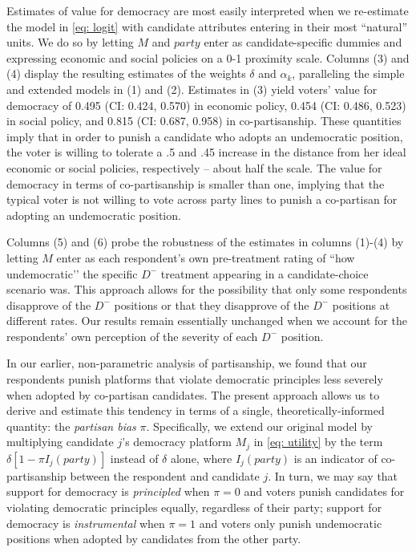 \documentclass[letterpaper, 12pt]{article}
\begin{document}
\begin{raggedright}
Estimates of value for democracy are most easily interpreted when we re-estimate the model in \eqref{eq: logit} with candidate attributes entering in their most ``natural'' units. We do so by letting $M$ and $party$ enter as candidate-specific dummies and expressing economic and social policies on a 0-1 proximity scale. Columns (3) and (4) display the resulting estimates of the weights $\delta$ and $\alpha_k$, paralleling the simple and extended models in (1) and (2). Estimates in (3) yield voters' value for democracy of 0.495 (CI: 0.424, 0.570) in economic policy, 0.454 (CI: 0.486, 0.523) in social policy, and 0.815 (CI: 0.687, 0.958) in co-partisanship. These quantities imply that in order to punish a candidate who adopts an undemocratic position, the voter is willing to tolerate a .5 and .45 increase in the distance from her ideal economic or social policies, respectively -- about half the scale. The value for democracy in terms of co-partisanship is smaller than one, implying that the typical voter is not willing to vote across party lines to punish a co-partisan for adopting an undemocratic position.

Columns (5) and (6) probe the robustness of the estimates in columns (1)-(4) by letting $M$ enter as each respondent's own pre-treatment rating of ``how undemocratic’’ the specific $D^-$ treatment appearing in a candidate-choice scenario was. This approach allows for the possibility that only some respondents disapprove of the $D^-$ positions or that they disapprove of the $D^-$ positions at different rates. Our results remain essentially unchanged when we account for the respondents' own perception of the severity of each $D^-$ position.

In our earlier, non-parametric analysis of partisanship, we found that our respondents punish platforms that violate democratic principles less severely when adopted by co-partisan candidates. The present approach allows us to derive and estimate this tendency in terms of a single, theoretically-informed quantity: the \emph{partisan bias} $\pi$. Specifically, we extend our original model by multiplying candidate $j$'s democracy platform $M_j$ in \eqref{eq: utility} by the term $\delta[1-\pi I_{j}(party)]$ instead of $\delta$ alone, where $I_{j}(party)$ is an indicator of co-partisanship between the respondent and candidate $j$. In turn, we may say that support for democracy is \emph{principled} when $\pi=0$ and voters punish candidates for violating democratic principles equally, regardless of their party; support for democracy is \emph{instrumental} when $\pi=1$ and voters only punish undemocratic positions when adopted by candidates from the other party.


\end{raggedright}
\end{document}
